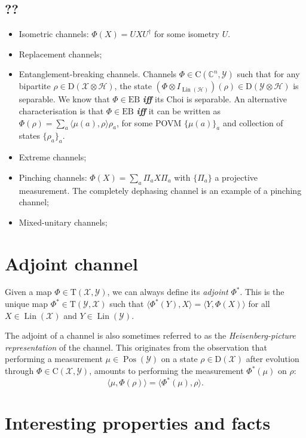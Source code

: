 \documentclass[12pt]{report}
\newcommand{\CC}{\mathbb{C}}
\newcommand{\calH}{{\mathcal{H}}}
\newcommand{\calY}{{\mathcal{Y}}}
\newcommand{\calX}{{\mathcal{X}}}
\newcommand{\rmC}{{\mathrm{C}}}
\newcommand{\rmD}{{\mathrm{D}}}
\newcommand{\rmT}{{\mathrm{T}}}
\DeclareMathOperator{\Pos}{Pos}
\DeclareMathOperator{\Lin}{Lin}
\begin{document}
\subsection{??}

\begin{itemize}
	\item Isometric channels: $\Phi(X)=UXU^\dagger$ for some isometry $U$.
	\item Replacement channels;
	\item Entanglement-breaking channels. Channels $\Phi\in\rmC(\CC^n,\calY)$ such that for any bipartite $\rho\in\rmD(\calX\otimes\calH)$, the state $(\Phi\otimes I_{\Lin(\calH)})(\rho)\in\rmD(\calY\otimes\calH)$ is separable. We know that $\Phi\in\mathrm{EB}$ \emph{\textbf{iff}} its Choi is separable.
	An alternative characterisation is that $\Phi\in\mathrm{EB}$ \emph{\textbf{iff}} it can be written as $\Phi(\rho)=\sum_a \langle \mu(a),\rho\rangle \rho_a$, for some POVM $\{\mu(a)\}_a$ and collection of states $\{\rho_a\}_a$.
	\item Extreme channels;
	\item Pinching channels: $\Phi(X) =\sum_a \Pi_a X\Pi_a$ with $\{\Pi_a\}$ a projective measurement. The completely dephasing channel is an example of a pinching channel;
	\item Mixed-unitary channels;
\end{itemize}


\section{Adjoint channel}

Given a map $\Phi\in\rmT(\calX,\calY)$, we can always define its \emph{adjoint} $\Phi^*$. This is the unique map $\Phi^*\in\rmT(\calY,\calX)$ such that $\langle \Phi^*(Y),X\rangle=\langle Y,\Phi(X)\rangle$ for all $X\in\Lin(\calX)$ and $Y\in\Lin(\calY)$.

The adjoint of a channel is also sometimes referred to as the \emph{Heisenberg-picture representation} of the channel. This originates from the observation that performing a measurement $\mu\in\Pos(\calY)$ on a state $\rho\in\rmD(\calX)$ after evolution through $\Phi\in\rmC(\calX,\calY)$, amounts to performing the measurement $\Phi^*(\mu)$ on $\rho$:
\begin{equation}
	\langle \mu,\Phi(\rho) \rangle = \langle \Phi^*(\mu),\rho\rangle.
\end{equation}


\section{Interesting properties and facts}
\end{document}
